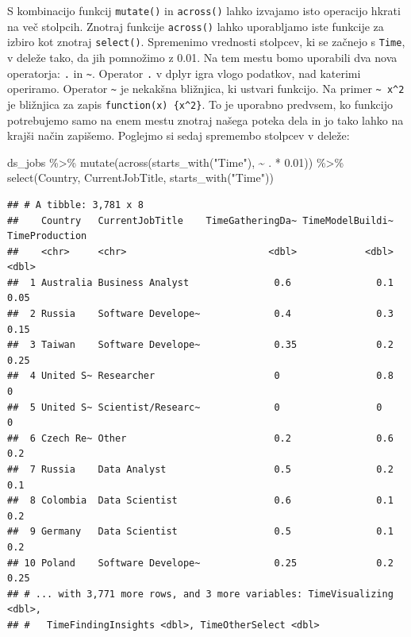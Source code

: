 \documentclass[
]{book}
\newenvironment{Shaded}{\begin{snugshade}}{\end{snugshade}}
\newcommand{\FloatTok}[1]{\textcolor[rgb]{0.00,0.00,0.81}{#1}}
\newcommand{\FunctionTok}[1]{\textcolor[rgb]{0.00,0.00,0.00}{#1}}
\newcommand{\NormalTok}[1]{#1}
\newcommand{\SpecialCharTok}[1]{\textcolor[rgb]{0.00,0.00,0.00}{#1}}
\newcommand{\StringTok}[1]{\textcolor[rgb]{0.31,0.60,0.02}{#1}}
\begin{document}
S kombinacijo funkcij \texttt{mutate()} in \texttt{across()} lahko izvajamo isto operacijo hkrati na več stolpcih. Znotraj funkcije \texttt{across()} lahko uporabljamo iste funkcije za izbiro kot znotraj \texttt{select()}. Spremenimo vrednosti stolpcev, ki se začnejo s \texttt{Time}, v deleže tako, da jih pomnožimo z 0.01. Na tem mestu bomo uporabili dva nova operatorja: \texttt{.} in \texttt{\textasciitilde{}}. Operator \texttt{.} v dplyr igra vlogo podatkov, nad katerimi operiramo. Operator \texttt{\textasciitilde{}} je nekakšna bližnjica, ki ustvari funkcijo. Na primer \texttt{\textasciitilde{}\ x\^{}2} je bližnjica za zapis \texttt{function(x)\ \{x\^{}2\}}. To je uporabno predvsem, ko funkcijo potrebujemo samo na enem mestu znotraj našega poteka dela in jo tako lahko na krajši način zapišemo. Poglejmo si sedaj spremembo stolpcev v deleže:

\begin{Shaded}
\begin{Highlighting}[]
\NormalTok{ds\_jobs }\SpecialCharTok{\%\textgreater{}\%}
  \FunctionTok{mutate}\NormalTok{(}\FunctionTok{across}\NormalTok{(}\FunctionTok{starts\_with}\NormalTok{(}\StringTok{"Time"}\NormalTok{), }\SpecialCharTok{\textasciitilde{}}\NormalTok{ . }\SpecialCharTok{*} \FloatTok{0.01}\NormalTok{)) }\SpecialCharTok{\%\textgreater{}\%}
  \FunctionTok{select}\NormalTok{(Country, CurrentJobTitle, }\FunctionTok{starts\_with}\NormalTok{(}\StringTok{"Time"}\NormalTok{))}
\end{Highlighting}
\end{Shaded}

\begin{verbatim}
## # A tibble: 3,781 x 8
##    Country   CurrentJobTitle    TimeGatheringDa~ TimeModelBuildi~ TimeProduction
##    <chr>     <chr>                         <dbl>            <dbl>          <dbl>
##  1 Australia Business Analyst               0.6               0.1           0.05
##  2 Russia    Software Develope~             0.4               0.3           0.15
##  3 Taiwan    Software Develope~             0.35              0.2           0.25
##  4 United S~ Researcher                     0                 0.8           0   
##  5 United S~ Scientist/Researc~             0                 0             0   
##  6 Czech Re~ Other                          0.2               0.6           0.2 
##  7 Russia    Data Analyst                   0.5               0.2           0.1 
##  8 Colombia  Data Scientist                 0.6               0.1           0.2 
##  9 Germany   Data Scientist                 0.5               0.1           0.2 
## 10 Poland    Software Develope~             0.25              0.2           0.25
## # ... with 3,771 more rows, and 3 more variables: TimeVisualizing <dbl>,
## #   TimeFindingInsights <dbl>, TimeOtherSelect <dbl>
\end{verbatim}
\end{document}
